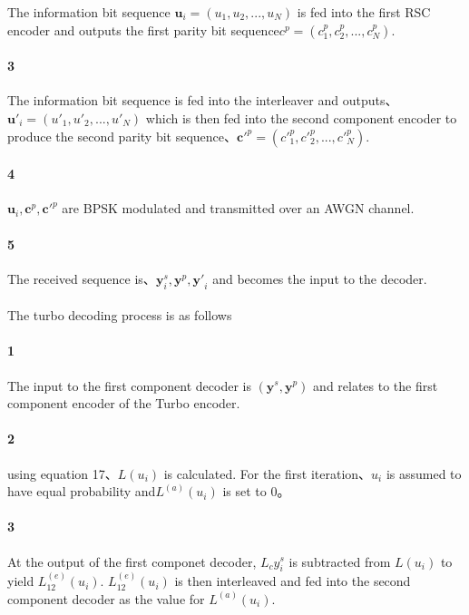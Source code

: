 \documentclass[20 pts]{article}
\begin{document}
 The information bit sequence $\boldsymbol{u}_i=(u_1,u_2,...,u_N)$ is fed into the first RSC encoder and outputs the first parity bit sequence${c}^p=(c_1^p,c_2^p,...,c_N^p)$.\paragraph{3}

 The information bit sequence is fed into the interleaver and outputs、${\boldsymbol{u}'}_i=({u'}_1,{u'}_2,...,{u'}_N)$ which is then fed into the second component encoder to produce the second parity bit sequence、${\boldsymbol{c}'}^p=({c'}_1^p,{c'}_2^p,...,{c'}_N^p)$.

\paragraph{4} $\boldsymbol{u}_i,\boldsymbol{c}^p,{\boldsymbol{c}'}^p$ are BPSK modulated and transmitted over an AWGN channel.\\

\paragraph{5} The received sequence is、$\boldsymbol{y}_i^s,\boldsymbol{y}^p,{\boldsymbol{y}'}_i$ and becomes the input to the decoder.\paragraph{}

The turbo decoding process is as follows
\paragraph{1}
The input to the first component decoder is $(\boldsymbol{y}^s,\boldsymbol{y}^p)$ and relates to the first component encoder of the Turbo encoder.
\paragraph{2}
using equation 17、$L(u_i)$ is calculated. For the first iteration、$u_i$ is assumed to have equal probability and$L^{(a)}(u_i)$ is set to 0。
\paragraph{3}
At the output of the first componet decoder, $L_cy_i^s$ is subtracted from $L(u_i)$ to yield $L_{12}^{(e)}(u_i)$. $L_{12}^{(e)}(u_i)$ is then interleaved and fed into the second component decoder as the value for $L^{(a)}(u_i)$.
\end{document}
